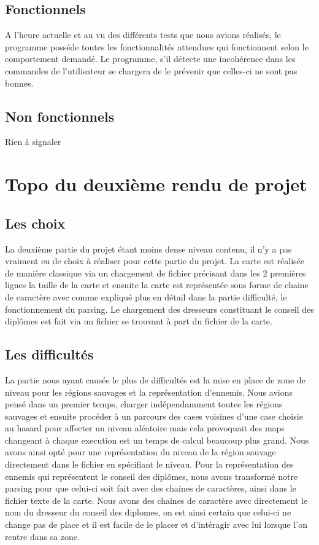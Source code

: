 \documentclass[10pt,a4paper,twocolumn]{report}
\begin{document}
\section{Fonctionnels}

A l'heure actuelle et au vu des différents tests que nous avions réalisés, le programme posséde toutes les fonctionnalités attendues qui fonctionnent selon le comportement demandé.
Le programme, s'il détecte une incohérence dans les commandes de l'utilisateur se chargera de le prévenir que celles-ci ne sont pas bonnes.

\section{Non fonctionnels}
Rien à signaler

\chapter{Topo du deuxième rendu de projet}

\section{Les choix}

La deuxième partie du projet étant moins dense niveau contenu, il n'y a pas vraiment eu de choix à réaliser pour cette partie du projet. La carte est réalisée de manière classique via un chargement de fichier précisant dans les 2 premières lignes la taille de la carte et ensuite la carte est représentée sous forme de chaine de caractère avec comme expliqué plus en détail dans la partie difficulté, le fonctionnement du parsing.
Le chargement des dresseurs constituant le conseil des diplômes est fait via un fichier se trouvant à part du fichier de la carte.

\section{Les difficultés}

La partie nous ayant causée le plus de difficultés est la mise en place de zone de niveau pour les régions sauvages et la représentation d'ennemis.
Nous avions pensé dans un premier temps, charger indépendamment toutes les régions sauvages et ensuite procéder à un parcours des cases voisines d'une case choisie au hasard pour affecter un niveau aléatoire mais cela provoquait des maps changeant à chaque execution est un temps de calcul beaucoup plus grand. Nous avons ainsi opté pour une représentation du niveau de la région sauvage directement dans le fichier en spécifiant le niveau.
Pour la représentation des ennemis qui représentent le conseil des diplômes, nous avons transformé notre parsing pour que celui-ci soit fait avec des chaines de caractères, ainsi dans le fichier texte de la carte. Nous avons des chaines de caractère avec directement le nom du dresseur du conseil des diplomes, on est ainsi certain que celui-ci ne change pas de place et il est facile de le placer et d'intéragir avec lui lorsque l'on rentre dans sa zone.
\end{document}
